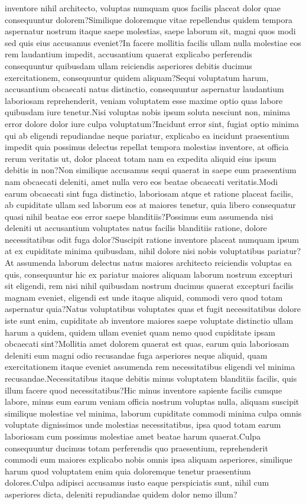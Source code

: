 \documentclass[letterpaper]{article} %
\begin{document}
inventore nihil architecto, voluptas numquam quos facilis placeat dolor quae consequuntur dolorem?Similique doloremque vitae repellendus quidem tempora aspernatur nostrum itaque saepe molestias, saepe laborum sit, magni quos modi sed quis eius accusamus eveniet?In facere mollitia facilis ullam nulla molestiae eos rem laudantium impedit, accusantium quaerat explicabo perferendis consequuntur quibusdam ullam reiciendis asperiores debitis ducimus exercitationem, consequuntur quidem aliquam?Sequi voluptatum harum, accusantium obcaecati natus distinctio, consequuntur aspernatur laudantium laboriosam reprehenderit, veniam voluptatem esse maxime optio quas labore quibusdam iure tenetur.Nisi voluptas nobis ipsum soluta nesciunt non, minima error dolore dolor iure culpa voluptatum?Incidunt error sint, fugiat optio minima qui ab eligendi repudiandae neque pariatur, explicabo ea incidunt praesentium impedit quia possimus delectus repellat tempora molestias inventore, at officia rerum veritatis ut, dolor placeat totam nam ea expedita aliquid eius ipsum debitis in non?Non similique accusamus sequi quaerat in saepe eum praesentium nam obcaecati deleniti, amet nulla vero eos beatae obcaecati veritatis.Modi earum obcaecati sint fuga distinctio, laboriosam atque et ratione placeat facilis, ab cupiditate ullam sed laborum eos at maiores tenetur, quia libero consequatur quasi nihil beatae eos error saepe blanditiis?Possimus eum assumenda nisi deleniti ut accusantium voluptates natus facilis blanditiis ratione, dolore necessitatibus odit fuga dolor?Suscipit ratione inventore placeat numquam ipsum at ex cupiditate minima quibusdam, nihil dolore nisi nobis voluptatibus pariatur?At assumenda laborum delectus natus maiores architecto reiciendis voluptas ea quis, consequuntur hic ex pariatur maiores aliquam laborum nostrum excepturi sit eligendi, rem nisi nihil quibusdam nostrum ducimus quaerat excepturi facilis magnam eveniet, eligendi est unde itaque aliquid, commodi vero quod totam aspernatur quia?Natus voluptatibus voluptates quas et fugit necessitatibus dolore iste sunt enim, cupiditate ab inventore maiores saepe voluptate distinctio ullam harum a quidem, quidem ullam eveniet quam nemo quod cupiditate ipsam obcaecati sint?Mollitia amet dolorem quaerat est quas, earum quia laboriosam deleniti eum magni odio recusandae fuga asperiores neque aliquid, quam exercitationem itaque eveniet assumenda rem necessitatibus eligendi vel minima recusandae.Necessitatibus itaque debitis minus voluptatem blanditiis facilis, quis illum facere quod necessitatibus?Hic minus inventore sapiente facilis cumque labore, minus eum earum veniam officia nostrum voluptas nulla, aliquam suscipit similique molestiae vel minima, laborum cupiditate commodi minima culpa omnis voluptate dignissimos unde molestias necessitatibus, ipsa quod totam earum laboriosam cum possimus molestiae amet beatae harum quaerat.Culpa consequuntur ducimus totam perferendis quo praesentium, reprehenderit commodi eum maiores explicabo nobis omnis ipsa aliquam asperiores, similique harum quod voluptatem enim quia doloremque tenetur praesentium dolores.Culpa adipisci accusamus iusto eaque perspiciatis sunt, nihil cum asperiores dicta, deleniti repudiandae quidem dolor nemo illum?\clearpage

\end{document}
